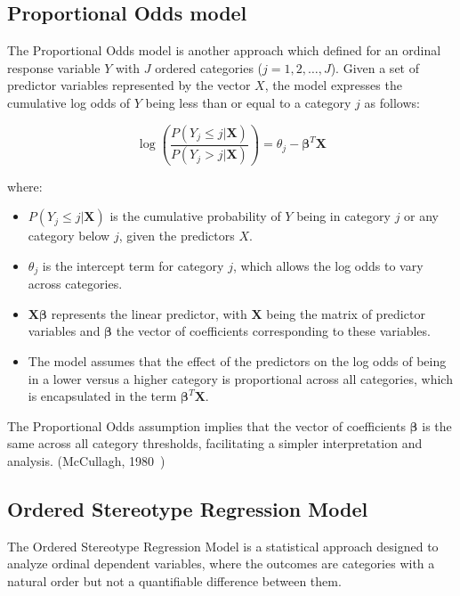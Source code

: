 \documentclass{article}
\begin{document}
\subsection{Proportional Odds model}

The Proportional Odds model is another approach which defined for an ordinal response variable $Y$ with $J$ ordered categories ($j=1, 2, \ldots, J$). 
Given a set of predictor variables represented by the vector $X$, the model expresses the cumulative log odds of $Y$ being less than or equal to a category $j$ as follows:

\[
\log\left(\frac{P(Y_j \leq j | \mathbf{X})}{P(Y_j > j | \mathbf{X})}\right) = \theta_j - \boldsymbol{\beta}^T\mathbf{X}
\]

where:
\begin{itemize}
    \item $P(Y_j \leq j | \mathbf{X})$ is the cumulative probability of $Y$ being in category $j$ or any category below $j$, given the predictors $X$.
    \item $\theta_j$ is the intercept term for category $j$, which allows the log odds to vary across categories.
    \item $\mathbf{X}\boldsymbol{\beta}$ represents the linear predictor, with $\mathbf{X}$ being the matrix of predictor variables and $\boldsymbol{\beta}$ the vector of coefficients corresponding to these variables.
    \item The model assumes that the effect of the predictors on the log odds of being in a lower versus a higher category is proportional across all categories, which is encapsulated in the term $\boldsymbol{\beta}^T\mathbf{X}$.
\end{itemize}

The Proportional Odds assumption implies that the vector of coefficients $\boldsymbol{\beta}$ is the same across all category thresholds, facilitating a simpler interpretation and analysis. (McCullagh, 1980~\cite{mccullagh1980regression})


\subsection{Ordered Stereotype Regression Model}

The Ordered Stereotype Regression Model is a statistical approach designed to analyze ordinal dependent variables, where the outcomes are categories with a natural order but not a quantifiable difference between them.
\end{document}
